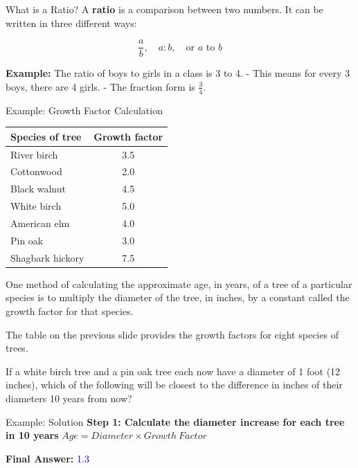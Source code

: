 \documentclass{beamer}
\begin{document}
\begin{frame}{What is a Ratio?}
    A \textbf{ratio} is a comparison between two numbers. It can be written in three different ways:
    
    \[
    \frac{a}{b}, \quad a:b, \quad \text{or } a \text{ to } b
    \]

    \textbf{Example:} The ratio of boys to girls in a class is 3 to 4.  
    - This means for every 3 boys, there are 4 girls.  
    - The fraction form is \( \frac{3}{4} \).
\end{frame}




\begin{frame}{Example: Growth Factor Calculation}

        \begin{tabular}{|l|c|}
            \hline
            \textbf{Species of tree} & \textbf{Growth factor} \\ \hline
            River birch & 3.5 \\ \hline
            Cottonwood & 2.0 \\ \hline
            Black walnut & 4.5 \\ \hline
            White birch & 5.0 \\ \hline
            American elm & 4.0 \\ \hline
            Pin oak & 3.0 \\ \hline
            Shagbark hickory & 7.5 \\ \hline
        \end{tabular}

        One method of calculating the approximate age, in years, of a tree of a particular species is to multiply the diameter of the tree, in inches, by a constant called the growth factor for that species.

        The table on the previous slide provides the growth factors for eight species of trees.

        If a white birch tree and a pin oak tree each now have a diameter of 1 foot (12 inches), which of the following will be closest to the difference in inches of their diameters 10 years from now?  
\end{frame}

\begin{frame}{Example: Solution}
    \textbf{Step 1: Calculate the diameter increase for each tree in 10 years}
    $Age = Diameter \times Growth\ Factor $

    

    \textbf{Final Answer:} \textcolor{blue}{ 1.3}
\end{frame}
\end{document}
